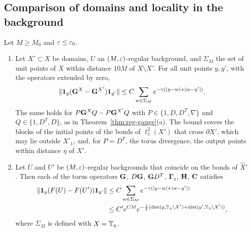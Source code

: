 \subsection{Comparison of domains and locality in the background}\label{ss:19.5}

\begin{theorem}[Locality]\label{thm:reg-locality}
Let $M\ge M_0$ and $\varepsilon\le\varepsilon_0$.
\begin{enumerate}[label=(\alph*)]
\item Let $X'\subset X$ be domains, $U$ an $(M,\varepsilon)$-regular background, and $\Sigma_M$ the set of unit points of $X$ within distance $10M$ of $X\setminus X'$. For all unit points $y,y'$, with the operators extended by zero,
\[
\|\mathbf 1_y(\mathbf G^X-\mathbf G^{X'})\mathbf 1_{y'}\|\le C\sum_{w\in\Sigma_M}e^{-\gamma(|y-w|+|w-y'|)}.
\]
The same holds for $P\mathbf G^XQ-P\mathbf G^{X'}Q$ with $P\in\{1,D,D^T,\nabla\}$ and $Q\in\{1,D^T,D\}$, as in Theorem~\ref{thm:reg-gauge}(a). The bound covers the blocks of the initial points of the bonds of $\ell^2_1(X')$ that cross $\partial X'$, which may lie outside $X'_1$, and, for $P=D^T$, the torus divergence, the output points within distance $\eta$ of $X'$.
\item Let $U$ and $U'$ be $(M,\varepsilon)$-regular backgrounds that coincide on the bonds of $\hat X'$. Then each of the torus operators $\mathbf G$, $D\mathbf G$, $\mathbf G D^T$, $\boldsymbol\Gamma_\pi$, $\mathbf H$, $\mathbf C$ satisfies
\[
\begin{aligned}
\|\mathbf 1_y(F(U)-F(U'))\mathbf 1_{y'}\|&\le C\sum_{w\in\Sigma_M}e^{-\gamma(|y-w|+|w-y'|)}\\
&\le C'e^{CM}e^{-\frac\gamma2(\operatorname{dist}(y,\mathbb T_\eta\setminus X')+\operatorname{dist}(y',\mathbb T_\eta\setminus X'))},
\end{aligned}
\]
where $\Sigma_M$ is defined with $X=\mathbb T_\eta$.
\end{enumerate}
\end{theorem}

